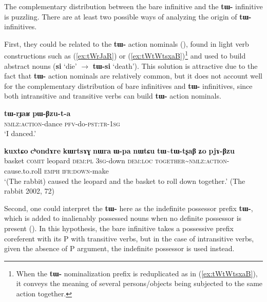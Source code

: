 \documentclass[oneside,a4paper,11pt]{article}
\newcommand{\ipa}[1]{\textbf{\phon#1}} %
\newcommand{\tld}{\textasciitilde{}}
\begin{document}
The complementary distribution between the bare infinitive and the \ipa{tɯ-} infinitive is puzzling. There are at least two possible ways of analyzing the origin of  \ipa{tɯ-} infinitives. 


First, they could be related to the \ipa{tɯ-} action nominals (\citealt{jacques14antipassive}), found in light verb constructions such as (\ref{ex:tWrJaR}) or (\ref{ex:tWtWtsxaB})\footnote{When the \ipa{tɯ-} nominalization prefix is reduplicated as in (\ref{ex:tWtWtsxaB}), it conveys the meaning of several persons/objects being subjected to the same action together. } and used to build abstract nouns (\ipa{si} `die' $\rightarrow$ \ipa{tɯ-si} `death'). This solution is attractive due to the fact that \ipa{tɯ-} action nominals are relatively common, but it does not account well for the complementary distribution of bare infinitives and \ipa{tɯ-} infinitives, since both intransitive and transitive verbs can build \ipa{tɯ-} action nominals.

\begin{exe}
\ex \label{ex:tWrJaR}
\gll \ipa{tɯ-rɟaʁ} \ipa{pɯ-βzu-t-a} \\
\textsc{nmlz:action}-dance \textsc{pfv}-do-\textsc{pst:tr-1sg} \\
\glt `I danced.'
\end{exe}

\begin{exe}
\ex \label{ex:tWtWtsxaB}
\gll
\ipa{kuxtɕo} 	\ipa{cʰondɤre}  	\ipa{kɯrtsɤɣ} 	\ipa{nɯra} 	\ipa{ɯ-pa} 	\ipa{nɯtɕu} 	\ipa{tɯ\tld{}tɯ-tʂaβ} 	\ipa{ʑo} 	\ipa{pjɤ-βzu} \\
basket \textsc{comit} leopard \textsc{dem:pl} \textsc{3sg}-down \textsc{dem:loc} \textsc{together}\tld{}\textsc{nmlz:action}-cause.to.roll \textsc{emph} \textsc{ifr:down}-make \\
\glt `(The rabbit) caused the leopard and the basket to roll down together.' (The rabbit 2002, 72)
\end{exe}

Second, one could interpret the \ipa{tɯ-} here as the indefinite possessor prefix \ipa{tɯ-}, which is added to inalienably possessed nouns when no definite possessor is present (\citealt{jacques15generic}). In this hypothesis, the bare infinitive takes a possessive prefix coreferent with its P with transitive verbs, but in the case of intransitive verbs, given the absence of P argument, the indefinite possessor is used instead.
\end{document}
